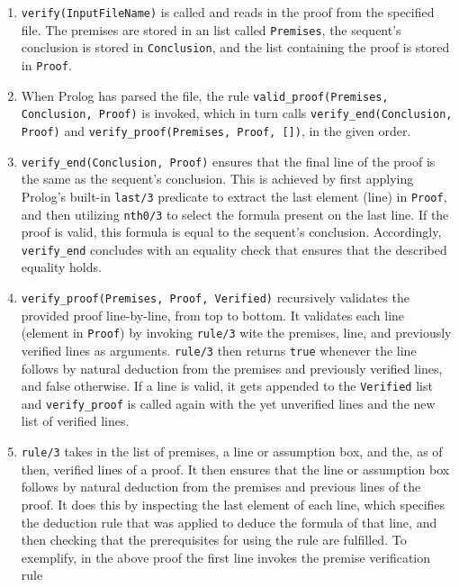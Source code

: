 \documentclass[a4paper, 11pt]{article}
\begin{document}
   \begin{enumerate}
      \item \texttt{verify(InputFileName)} is called
            and reads in the proof from the specified file.
            The premises are stored in an list called
            \texttt{Premises}, the sequent's conclusion is
            stored in \texttt{Conclusion}, and the list
            containing the proof is stored in \texttt{Proof}.

      \item When Prolog has parsed the file, the rule
            \texttt{valid\_proof(Premises, Conclusion, Proof)}
            is invoked, which in turn calls
            \texttt{verify\_end(Conclusion, Proof)} and
            \texttt{verify\_proof(Premises, Proof, [])}, in
            the given order.

      \item \texttt{verify\_end(Conclusion, Proof)} ensures 
            that the final line of the proof is the same as
            the sequent's conclusion. This is achieved by
            first applying Prolog's built-in \texttt{last/3}
            predicate to extract the last element (line) in
            \texttt{Proof}, and then utilizing \texttt{nth0/3} 
            to select the formula present on the last line. If
            the proof is valid, this formula is equal to
            the sequent's conclusion. Accordingly, 
            \texttt{verify\_end} concludes with an equality
            check that ensures that the described equality
            holds.

      \item
         \texttt{verify\_proof(Premises, Proof, Verified)}
         recursively validates the provided proof
         line-by-line, from top to bottom. It validates each 
         line (element in \texttt{Proof}) by invoking 
         \texttt{rule/3} wite the premises, line, and 
         previously verified lines as arguments. 
         \texttt{rule/3} then returns \texttt{true} whenever 
         the line follows by natural deduction from the 
         premises and previously verified lines, and false
         otherwise. If a line is valid, it gets appended to
         the \texttt{Verified} list and \texttt{verify\_proof}
         is called again with the yet unverified lines and
         the new list of verified lines.

      \item \texttt{rule/3} takes in the list of premises, a
            line or assumption box, and the, as of then, 
            verified lines of a proof. It then ensures that
            the line or assumption box follows by natural
            deduction from the premises and previous lines of
            the proof. It does this by inspecting the last
            element of each line, which specifies the
            deduction rule that was applied to deduce the
            formula of that line, and then checking that the
            prerequisites for using the rule are fulfilled.
            To exemplify, in the above proof the first line
            invokes the premise verification rule


\end{enumerate}
\end{document}
